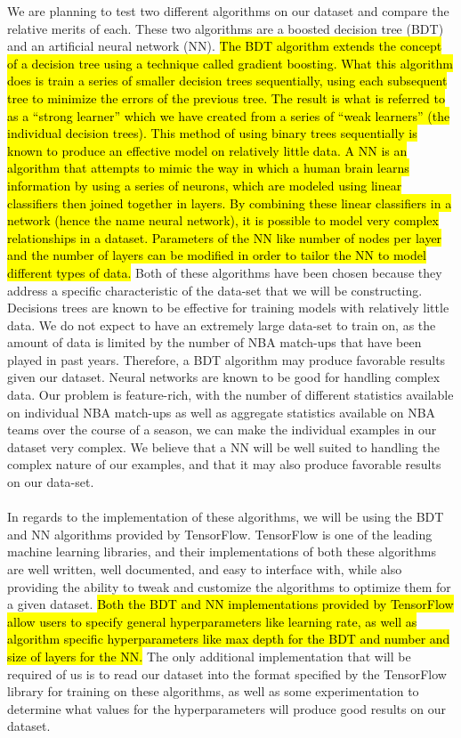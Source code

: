 \documentclass[letterpaper]{article} %
\begin{document}
We are planning to test two different algorithms on our dataset and compare the relative merits of each. These two algorithms are a boosted decision tree (BDT) and an artificial neural network (NN). \hl{The BDT algorithm extends the concept of a decision tree using a technique called gradient boosting. What this algorithm does is train a series of smaller decision trees sequentially, using each subsequent tree to minimize the errors of the previous tree. The result is what is referred to as a “strong learner” which we have created from a series of “weak learners” (the individual decision trees). This method of using binary trees sequentially is known to produce an effective model on relatively little data. A NN is an algorithm that attempts to mimic the way in which a human brain learns information by using a series of neurons, which are modeled using linear classifiers then joined together in layers. By combining these linear classifiers in a network (hence the name neural network), it is possible to model very complex relationships in a dataset. Parameters of the NN like number of nodes per layer and the number of layers can be modified in order to tailor the NN to model different types of data.} Both of these algorithms have been chosen because they address a specific characteristic of the data-set that we will be constructing. Decisions trees are known to be effective for training models with relatively little data. We do not expect to have an extremely large data-set to train on, as the amount of data is limited by the number of NBA match-ups that have been played in past years. Therefore, a BDT algorithm may produce favorable results given our dataset. Neural networks are known to be good for handling complex data. Our problem is feature-rich, with the number of different statistics available on individual NBA match-ups as well as aggregate statistics available on NBA teams over the course of a season, we can make the individual examples in our dataset very complex. We believe that a 
NN will be well suited to handling the complex nature of our examples, and that it may also produce favorable results on our data-set. \\ \hl{  } \\ 
In regards to the implementation of these algorithms, we will be using the BDT and NN algorithms provided by TensorFlow. TensorFlow is one of the leading machine learning libraries, and their implementations of both these algorithms are well written, well documented, and easy to interface with, while also providing the ability to tweak and customize the algorithms to optimize them for a given dataset. \hl{Both the BDT and NN implementations provided by TensorFlow allow users to specify general hyperparameters like learning rate, as well as algorithm specific hyperparameters like max depth for the BDT and number and size of layers for the NN.} The only additional implementation that will be required of us is to read our dataset into the format specified by the TensorFlow library for training on these algorithms, as well as some experimentation to determine what values for the hyperparameters will produce good results on our dataset. \\ \hl{  } \\	
\end{document}
